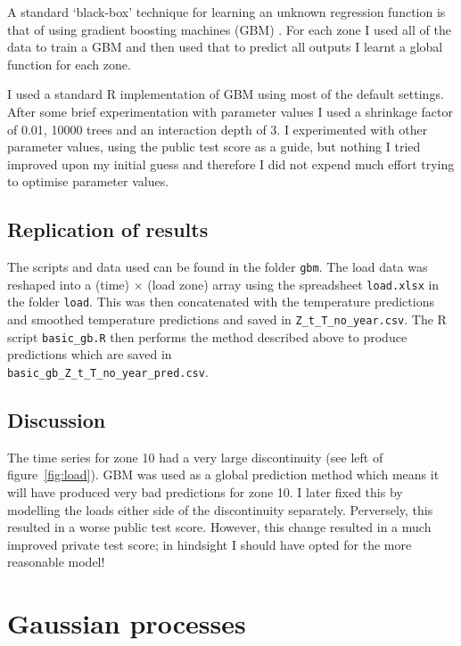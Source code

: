 \documentclass[preprint,authoryear,12pt]{elsarticle}
\begin{document}
A standard `black-box' technique for learning an unknown regression function is that of using gradient boosting machines (GBM) \citep[e.g. chapter 10 of][]{Hastie2009}.
For each zone I used all of the data to train a GBM and then used that to predict all outputs \ie I learnt a global function for each zone.

I used a standard R implementation of GBM using most of the default settings\footnotemark.
After some brief experimentation with parameter values I used a shrinkage factor of 0.01, 10000 trees and an interaction depth of 3.
I experimented with other parameter values, using the public test score as a guide, but nothing I tried improved upon my initial guess and therefore I did not expend much effort trying to optimise parameter values.


\subsection{Replication of results}

The scripts and data used can be found in the folder \texttt{gbm}.
The load data was reshaped into a (time) $\times$ (load zone) array using the spreadsheet \texttt{load.xlsx} in the folder \texttt{load}.
This was then concatenated with the temperature predictions and smoothed temperature predictions and saved in \texttt{Z\_t\_T\_no\_year.csv}.
The R script \texttt{basic\_gb.R} then performs the method described above to produce predictions which are saved in \\ \texttt{basic\_gb\_Z\_t\_T\_no\_year\_pred.csv}.

\subsection{Discussion}

The time series for zone 10 had a very large discontinuity (see left of figure~\ref{fig:load}).
GBM was used as a global prediction method which means it will have produced very bad predictions for zone 10.
I later fixed this by modelling the loads either side of the discontinuity separately.
Perversely, this resulted in a worse public test score.
However, this change resulted in a much improved private test score; in hindsight I should have opted for the more reasonable model!

\section{Gaussian processes}
\end{document}
